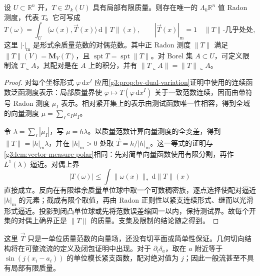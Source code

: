 \begin{proposition}\label{g3:prop:current-mass-representation}
	设 \(U\subset\mathbb R^n\) 开，\(T\in\mathcal D_k(U)\) 具有局部有限质量。则存在唯一的 \(\Lambda_k\mathbb R^n\) 值 Radon 测度，代表 \(T\)。它可写成
	\begin{equation}\label{g3:eq:current-polar-representation}
		T(\omega)=\int_U\langle\omega(x),\vec T(x)\rangle\,\mathrm d\|T\|(x),
		\qquad |\vec T(x)|_{\mathrm m}=1\quad\|T\|\text{-几乎处处},
	\end{equation}
	这里 \(|\cdot|_{\mathrm m}\) 是形式余质量范数的对偶范数。其中正 Radon 测度 \(\|T\|\) 满足 \(\|T\|(V)=\mathbf M_V(T)\)，且 \(\operatorname{spt}T=\operatorname{spt}\|T\|\)。对 Borel 集 \(A\subset U\)，可定义限制流 \(T\llcorner A\)，其配对是在 \(A\) 上的积分，并有 \(\|T\llcorner A\|=\|T\|\llcorner A\)。
\end{proposition}
\begin{proof}
	对每个坐标形式 \(\varphi\,\mathrm dx^I\) 应用\cref{g3:prop:bv-dual-variation}证明中使用的连续函数泛函测度表示：局部质量界使 \(\varphi\mapsto T(\varphi\,\mathrm dx^I)\) 关于一致范数连续，因而由带符号 Radon 测度 \(\mu_I\) 表示。相对紧开集上的表示由测试函数唯一性相容，得到全域的向量测度 \(\mu=\sum_I e_I\mu_I\)。

	令 \(\lambda=\sum_I|\mu_I|\)，写 \(\mu=h\lambda\)。以质量范数计算向量测度的全变差，得到 \(\|T\|=|h|_{\mathrm m}\lambda\)，并在 \(|h|_{\mathrm m}>0\) 处取 \(\vec T=h/|h|_{\mathrm m}\)。这一等式的证明与\cref{g3:lem:vector-measure-polar}相同：先对简单向量函数使用有限分割，再作 \(L^1(\lambda)\) 逼近。对偶上界
	\[
		|T(\omega)|\le\int\|\omega(x)\|_*\,\mathrm d\|T\|(x)
	\]
	直接成立。反向在有限维余质量单位球中取一个可数稠密族，逐点选择使配对逼近 \(|h|_{\mathrm m}\) 的元素；截成有限个取值，再由 Radon 正则性以紧支连续形式、继而以光滑形式逼近。投影到闭凸单位球或先将范数误差缩回一以内，保持测试界。故每个开集的对偶上确界正是 \(\|T\|\) 的质量。支集及限制的结论随之得到。
\end{proof}

这里 \(\vec T\) 只是一单位质量范数的向量场，还没有切平面或简单性保证。几何切向结构将在可整流流的定义及闭包证明中出现。对于 \(\partial_i\delta_a\)，取在 \(a\) 附近等于 \(\sin(j(x_i-a_i))\) 的单位模长紧支函数，配对绝对值为 \(j\)；因此一般流甚至不具有局部有限质量。

